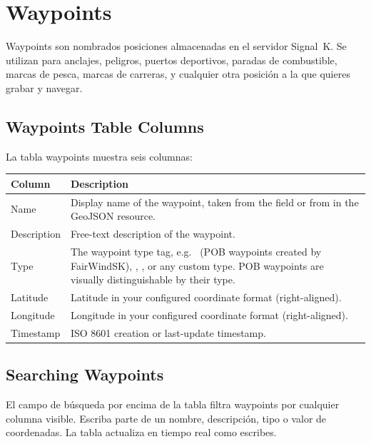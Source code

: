 \chapter{Waypoints}
\label{ch:waypoints}

Waypoints son nombrados posiciones almacenadas en el servidor Signal~K.
Se utilizan para anclajes, peligros, puertos deportivos, paradas de combustible, marcas de pesca, marcas de carreras, y cualquier
otra posición a la que quieres grabar y navegar.


\section{Waypoints Table Columns}

La tabla waypoints muestra seis columnas:

\begin{longtable}{L{2.4cm} L{11.3cm}}
\toprule
{}
{\sffamily\bfseries\color{white} Column} &
{\sffamily\bfseries\color{white} Description} \\
\midrule
Name & Display name of the waypoint, taken from the  field or from  in the GeoJSON resource. \\
Description & Free-text description of the waypoint. \\
Type & The waypoint type tag, e.g.\  (POB waypoints created by FairWindSK), , , or any custom type. POB waypoints are visually distinguishable by their type. \\
Latitude & Latitude in your configured coordinate format (right-aligned). \\
Longitude & Longitude in your configured coordinate format (right-aligned). \\
Timestamp & ISO 8601 creation or last-update timestamp. \\
\bottomrule
\end{longtable}

\section{Searching Waypoints}

El campo de búsqueda por encima de la tabla filtra waypoints por cualquier columna visible.
Escriba parte de un nombre, descripción, tipo o valor de coordenadas.
La tabla actualiza en tiempo real como escribes.

